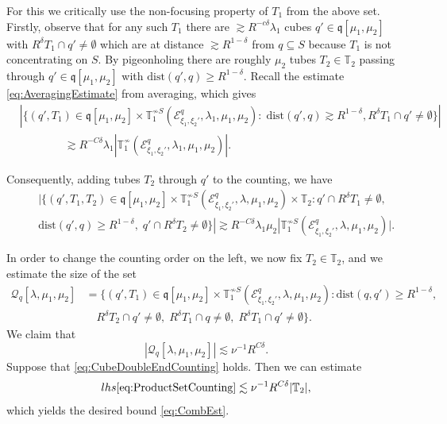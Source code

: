 \documentclass{amsart}
\theoremstyle{definition}
\newcommand{\T}{\mathbb{T}}
\begin{document}
For this we critically use the non-focusing property of $T_1$ from the above set. Firstly, observe that for any such $T_1$  there are $\gtrsim R^{-c \delta} \lambda_1$ cubes $q' \in \mathfrak{q}[\mu_1,\mu_2]$ with $R^\delta T_1 \cap q' \neq \emptyset$ which are at distance $\gtrsim R^{1-\delta}$ from $q \subseteq S$ because $T_1$ is not concentrating on $S$. By pigeonholing there are roughly $\mu_2$ tubes $T_{2} \in \T_2$ passing through $q' \in \mathfrak{q}[\mu_1,\mu_2]$ with $\text{dist}(q',q) \geq R^{1-\delta}$. 
Recall the estimate \eqref{eq:AveragingEstimate} from averaging, which gives 
\begin{equation*}
\begin{split}
&| \{ (q',T_1) \in \mathfrak{q}[\mu_1,\mu_2] \times \T_1^{\not \sim S}(\mathcal{E}^{q}_{\xi_1,\xi_2'},\lambda_1,\mu_1,\mu_2) : \; \text{dist}(q',q) \gtrsim R^{1-\delta}, 
 R^{\delta} T_1 \cap q' \neq \emptyset \} | \\ &\qquad \qquad\gtrsim R^{- C \delta} \lambda_1 | \T_1^{\not \sim}(\mathcal{E}^{q}_{\xi_1,\xi_2'},\lambda_1,\mu_1,\mu_2) |.
\end{split}
\end{equation*}

Consequently, adding tubes $T_2$ through $q'$ to the counting, we have
\begin{equation}
\label{eq:ProductSetCounting}
\begin{split}
&\quad | \{ (q',T_1,T_2) \in \mathfrak{q}[\mu_1,\mu_2] \times \T_1^{\not\sim S}(\mathcal{E}^{q}_{\xi_1,\xi_2'},\lambda,\mu_1,\mu_2) \times \T_2 :  q' \cap R^\delta T_{1} \neq \emptyset, \\
&\quad \text{dist}(q',q) \geq R^{1-\delta}, \;  q' \cap R^\delta T_{2} \neq \emptyset \}| \gtrsim R^{-C \delta} \lambda_1 \mu_2 |\T_1^{\not\sim S}(\mathcal{E}^{q}_{\xi_1,\xi_2'},\lambda,\mu_1,\mu_2)|.
\end{split}
\end{equation}

In order to change the counting order on the left, we now fix $T_{2} \in \T_2$, and we estimate the size of the set 
\begin{equation*}
\begin{split}
\mathcal{Q}_{q}[\lambda,\mu_1,\mu_2] &= \{ (q',T_1) \in \mathfrak{q}[\mu_1,\mu_2] \times \T_1^{\not\sim S}(\mathcal{E}^{q}_{\xi_1,\xi_2'},\lambda,\mu_1,\mu_2) : \text{dist}(q,q') \geq R^{1-\delta},   \\
&\quad R^{\delta} T_{2} \cap  q' \neq \emptyset, \; R^{\delta} T_1 \cap q \neq \emptyset, \; R^{\delta} T_1 \cap q' \neq \emptyset \}.
\end{split}
\end{equation*}
We claim that
\begin{equation}
\label{eq:CubeDoubleEndCounting0}
|\mathcal{Q}_{q}[\lambda,\mu_1,\mu_2]| \lesssim \nu^{-1} R^{C \delta}.
\end{equation}
Suppose that \eqref{eq:CubeDoubleEndCounting} holds. Then we can estimate
\begin{equation*}
lhs \eqref{eq:ProductSetCounting} \lesssim \nu^{-1} R^{C \delta} |\T_2|,
\end{equation*}
which yields the desired bound \eqref{eq:CombEst}.
\end{document}
